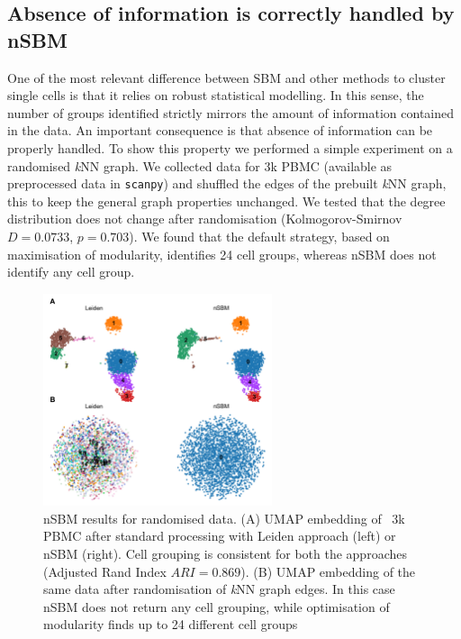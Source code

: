 \documentclass[10pt]{article}
\begin{document}

\subsection*{Absence of information is correctly handled by nSBM}

One of the most relevant difference between SBM and other methods to cluster single cells is that it relies on robust statistical modelling. In this sense, the number of groups identified strictly mirrors the amount of information contained in the data. An important consequence is that absence of information can be properly handled. To show this property we performed a simple experiment on a randomised \emph{k}NN graph. We collected data for 3k PBMC (available as preprocessed data in \texttt{scanpy}) and shuffled the edges of the prebuilt \emph{k}NN graph, this to keep the general graph properties unchanged. We tested that the degree distribution does not change after randomisation (Kolmogorov-Smirnov $D=0.0733$, $p=0.703$). We found that the default strategy, based on maximisation of modularity, identifies 24 cell groups, whereas nSBM does not identify any cell group. 

\begin{figure}[H]
\centering
\includegraphics[keepaspectratio,width=0.6\textwidth,height=\textheight]{FIgure_Random.png}
\caption[]{nSBM results for randomised data. (A) UMAP embedding of ~3k PBMC after standard processing with Leiden approach (left) or nSBM (right). Cell grouping is consistent for both the approaches (Adjusted Rand Index $ARI=0.869$). (B) UMAP embedding of the same data after randomisation of \emph{k}NN graph edges. In this case nSBM does not return any cell grouping, while optimisation of modularity finds up to 24 different cell groups}\label{FigureRandom}
\end{figure}
\end{document}
